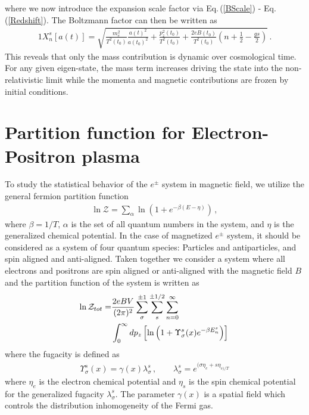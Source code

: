 \documentclass[twocolumn,preprintnumbers,amsmath,amssymb]{revtex4-2}
\newcommand{\req}[1]{Eq.\,({\ref{#1}})}
\begin{document}
where we now introduce the expansion scale factor via \req{BScale} - \req{Redshift}. The Boltzmann factor can then be written as
\begin{alignat}{1}
 \label{XScale} X_{n}^{s}[a(t)] = \sqrt{\frac{m_{e}^{2}}{T^{2}(t_{0})}\frac{a(t)^{2}}{a(t_{0})^{2}}+\frac{p_{z}^{2}(t_{0})}{T^{2}(t_{0})}+\frac{2eB(t_{0})}{T^{2}(t_{0})}\left(n+\frac{1}{2}-\frac{gs}{2}\right)}\,.
\end{alignat}
This reveals that only the mass contribution is dynamic over cosmological time. For any given eigen-state, the mass term increases driving the state into the non-relativistic limit while the momenta and magnetic contributions are frozen by initial conditions.



\section{Partition function for Electron-Positron plasma}\label{sec:Partition}

To study the statistical behavior of the $e^\pm$ system in magnetic field, we utilize the general fermion partition function~\cite{Elze:1980er}
\begin{align}
 \label{PartFunc} \ln\mathcal{Z}=\sum_{\alpha}\ln\left(1+e^{-\beta(E-\eta)}\right)\,,
\end{align}
where $\beta=1/T$, $\alpha$ is the set of all quantum numbers in the system, and $\eta$ is the generalized chemical potential. In the case of magnetized $e^{\pm}$ system, it should be considered as a system of four quantum species: Particles and antiparticles, and spin aligned and anti-aligned. Taken together we consider a system where all electrons and positrons are spin aligned or anti-aligned with the magnetic field $B$ and the partition function of the system is written as
\begin{align}\label{PartFuncB}
\ln\mathcal{Z}_{tot}=&\frac{2eBV}{(2\pi)^2}\sum_{\sigma}^{\pm1}\sum_{s}^{\pm1/2}\sum_{n=0}^\infty\notag\\
\qquad&\int^\infty_{0}dp_z\left[\ln\left(1+\Upsilon_{\sigma}^{s}(x)e^{-\beta E_{n}^{s}}\right)\right]\,
\end{align}
where the fugacity is defined as
\begin{align}\label{Fugacity}
\Upsilon_{\sigma}^{s}(x)=\gamma(x)\lambda_{\sigma}^{s}\,,\qquad\lambda_{\sigma}^{s}=e^{(\sigma\eta_{e}+s\eta_{s)/T}}
\end{align}
where $\eta_{e}$ is the electron chemical potential and $\eta_s$ is the spin chemical potential for the generalized fugacity $\lambda_{\sigma}^{s}$. The parameter $\gamma(x)$ is a spatial field which controls the distribution inhomogeneity of the Fermi gas. 
\end{document}
